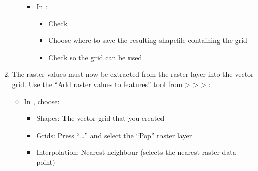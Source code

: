 \documentclass[letterpaper,10pt,english]{sphinxmanual}
\begin{document}
\begin{enumerate}
\begin{itemize}
\begin{itemize}
\begin{itemize}
\end{itemize}

\item {} 
In :
\begin{itemize}
\item {} 
Check 

\item {} 
Choose where to save the resulting shapefile containing the
grid

\item {} 
Check  so the grid can be used

\end{itemize}

\end{itemize}

\end{itemize}

\item {} 
The raster values must now be extracted from the raster layer into
the vector grid. Use the “Add raster values to features” tool from
 \textgreater{}  \textgreater{}  \textgreater{} :

\begin{figure}[htbp]
\centering
\capstart

\noindent{}
\caption{}\label{\detokenize{OtherManuals/LQF_Manual:id9}}\end{figure}

\begin{figure}[htbp]
\centering
\capstart

\noindent{}
\caption{}\label{\detokenize{OtherManuals/LQF_Manual:id10}}\end{figure}
\begin{itemize}
\item {} 
In , choose:
\begin{itemize}
\item {} 
Shapes: The vector grid that you created

\item {} 
Grids: Press “…” and select the “Pop” raster layer

\item {} 
Interpolation: Nearest neighbour (selects the nearest raster
data point)


\end{itemize}
\end{itemize}
\end{enumerate}
\end{document}
